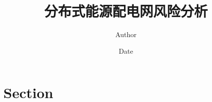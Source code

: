 \documentclass{article}
\title{分布式能源配电网风险分析}
\author{Author}
\date{Date}
\begin{document}
\maketitle

\section{Section}
\end{document}
